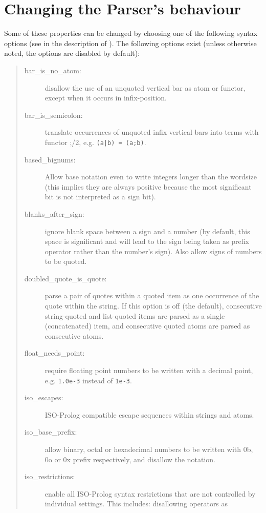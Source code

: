 \section{Changing the Parser's behaviour}
Some of these properties can be changed by choosing one of the following
syntax options (see  in the description of
).
The following options exist (unless otherwise noted, the options are
disabled by default):
\begin{quote}
\begin{description}
\item[bar_is_no_atom:] disallow the use of an unquoted vertical bar as
    atom or functor, except when it occurs in infix-position.
\item[bar_is_semicolon:] translate occurrences of unquoted infix
    vertical bars into terms with functor ;/2, e.g. \verb:(a|b) = (a;b):.
\item[based_bignums:] Allow base notation even to write integers longer
    than the wordsize (this implies they are always positive because the
    most significant bit is not interpreted as a sign bit).
\item[blanks_after_sign:] ignore blank space between a sign and a number
    (by default, this space is significant and will lead to the sign
    being taken as prefix operator rather than the number's sign).
    Also allow signs of numbers to be quoted.
\item[doubled_quote_is_quote:] parse a pair of quotes within a quoted item
    as one occurrence of the quote within the string. If this option is off
    (the default), consecutive string-quoted and list-quoted items are parsed
    as a single (concatenated) item, and consecutive quoted atoms are parsed
    as consecutive atoms.
\item[float_needs_point:] require floating point numbers to be written
    with a decimal point, e.g. \verb:1.0e-3: instead of \verb:1e-3:.
\item[iso_escapes:] ISO-Prolog compatible escape sequences within
    strings and atoms.
\item[iso_base_prefix:] allow binary, octal or hexadecimal numbers to be
  written
    with 0b, 0o or 0x prefix respectively, and disallow the
     notation.
\item[iso_restrictions:] 
      enable all ISO-Prolog syntax restrictions that are not controlled
      by individual settings. This includes: disallowing operators as

\end{description}
\end{quote}

